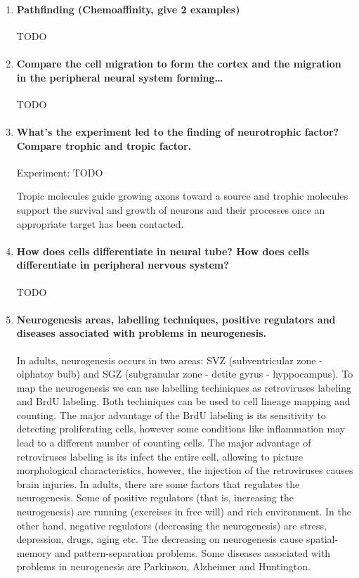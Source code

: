 \documentclass[12pt,article,oneside,a4paper]{memoir}
\begin{document}
\begin{enumerate}
\item \paragraph{Pathfinding (Chemoaffinity, give 2 examples)}
TODO

\item \paragraph{Compare the cell migration to form the cortex and the migration in the peripheral neural system forming…}
TODO

\item \paragraph{What’s the experiment led to the finding of neurotrophic factor? Compare trophic and tropic factor.}
Experiment: TODO

Tropic molecules guide growing axons toward a source and trophic molecules support the survival and growth of neurons and their processes once an appropriate target has been contacted.

\item \paragraph{How does cells differentiate in neural tube? How does cells differentiate in peripheral nervous system?}
TODO

\item \paragraph{Neurogenesis areas, labelling techniques, positive regulators and diseases associated with problems in neurogenesis.}
In adults, neurogenesis occurs in two areas: SVZ (subventricular zone - olphatoy bulb) and SGZ (subgranular zone - detite gyrus - hyppocampus). To map the neurogenesis we can use labelling techiniques as retroviruses labeling and BrdU labeling. Both techiniques can be used to cell lineage mapping and counting. The major advantage of the BrdU labeling is its sensitivity to detecting proliferating cells, however some conditions like inflammation may lead to a different number of counting cells. The major advantage of retroviruses labeling is its infect the entire cell, allowing to picture morphological characteristics, however, the injection of the retroviruses causes brain injuries.
In adults, there are some factors that regulates the neurogenesis. Some of positive regulators (that is, increasing the neurogenesis) are running (exercises in free will) and rich environment. In the other hand, negative regulators (decreasing the neurogenesis) are stress, depression, drugs, aging etc.
The decreasing on neurogenesis cause spatial-memory and pattern-separation problems.
Some diseases associated with problems in neurogenesis are Parkinson, Alzheimer and Huntington.


\end{enumerate}
\end{document}
